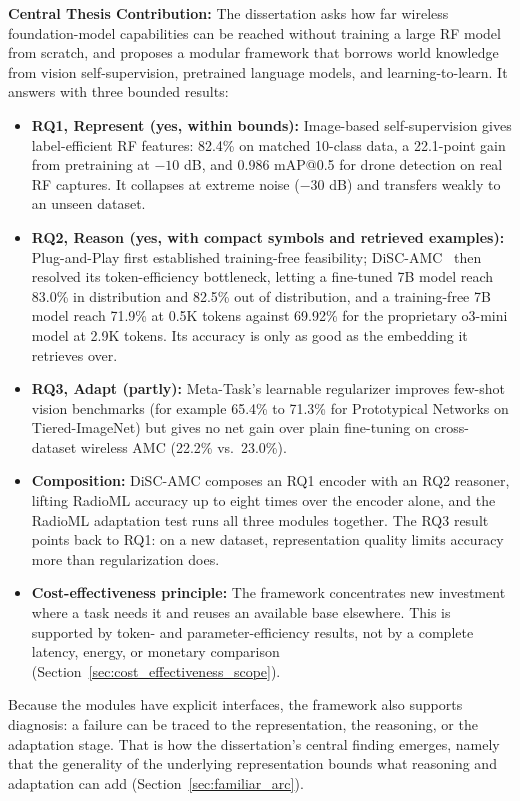 \textbf{Central Thesis Contribution:} The dissertation asks how far wireless foundation-model capabilities can be reached without training a large RF model from scratch, and proposes a modular framework that borrows world knowledge from vision self-supervision, pretrained language models, and learning-to-learn. It answers with three bounded results:

\begin{itemize}
    \item \textbf{RQ1, Represent (yes, within bounds):} Image-based self-supervision gives label-efficient RF features: 82.4\% on matched 10-class data, a 22.1-point gain from pretraining at $-10$ dB, and 0.986 mAP@0.5 for drone detection on real RF captures. It collapses at extreme noise ($-30$ dB) and transfers weakly to an unseen dataset.
    \item \textbf{RQ2, Reason (yes, with compact symbols and retrieved examples):} Plug-and-Play first established training-free feasibility; DiSC-AMC~\cite{disc_amc} then resolved its token-efficiency bottleneck, letting a fine-tuned 7B model reach 83.0\% in distribution and 82.5\% out of distribution, and a training-free 7B model reach 71.9\% at 0.5K tokens against 69.92\% for the proprietary o3-mini model at 2.9K tokens. Its accuracy is only as good as the embedding it retrieves over.
    \item \textbf{RQ3, Adapt (partly):} Meta-Task's learnable regularizer improves few-shot vision benchmarks (for example 65.4\% to 71.3\% for Prototypical Networks on Tiered-ImageNet) but gives no net gain over plain fine-tuning on cross-dataset wireless AMC (22.2\% vs.\ 23.0\%).
    \item \textbf{Composition:} DiSC-AMC composes an RQ1 encoder with an RQ2 reasoner, lifting RadioML accuracy up to eight times over the encoder alone, and the RadioML adaptation test runs all three modules together. The RQ3 result points back to RQ1: on a new dataset, representation quality limits accuracy more than regularization does.
    \item \textbf{Cost-effectiveness principle:} The framework concentrates new investment where a task needs it and reuses an available base elsewhere. This is supported by token- and parameter-efficiency results, not by a complete latency, energy, or monetary comparison (Section~\ref{sec:cost_effectiveness_scope}).
\end{itemize}

Because the modules have explicit interfaces, the framework also supports diagnosis: a failure can be traced to the representation, the reasoning, or the adaptation stage. That is how the dissertation's central finding emerges, namely that the generality of the underlying representation bounds what reasoning and adaptation can add (Section~\ref{sec:familiar_arc}).

